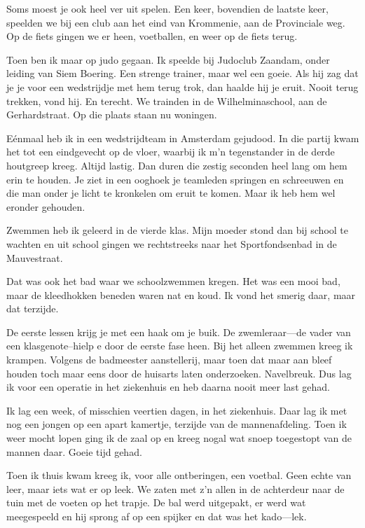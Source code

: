 \documentclass[10pt,twoside,openright]{memoir}
\begin{document}
Soms moest je ook heel ver uit spelen. Een keer, bovendien de laatste keer, speelden we bij een club aan het eind van Krommenie, aan de Provinciale weg. Op de fiets gingen we er heen, voetballen, en weer op de fiets terug. 

Toen ben ik maar op judo gegaan. Ik speelde bij Judoclub Zaandam, onder leiding van Siem Boering. Een strenge trainer, maar wel een goeie. Als hij zag dat je je voor een wedstrijdje met hem terug trok, dan haalde hij je eruit. Nooit terug trekken, vond hij. En terecht. We trainden in de Wilhelminaschool, aan de Gerhardstraat. Op die plaats staan nu woningen.

Eénmaal heb ik in een wedstrijdteam in Amsterdam gejudood. In die partij kwam het tot een eindgevecht op de vloer, waarbij ik m’n tegenstander in de derde houtgreep kreeg. Altijd lastig. Dan duren die zestig seconden heel lang om hem erin te houden. Je ziet in een ooghoek je teamleden springen en schreeuwen en die man onder je licht te kronkelen om eruit te komen. Maar ik heb hem wel eronder gehouden. 

Zwemmen heb ik geleerd in de vierde klas. Mijn moeder stond dan bij school te wachten en uit school gingen we rechtstreeks naar het Sportfondsenbad in de Mauvestraat. 

Dat was ook het bad waar we schoolzwemmen kregen. Het was een mooi bad, maar de kleedhokken beneden waren nat en koud. Ik vond het smerig daar, maar dat terzijde. 

De eerste lessen krijg je met een haak om je buik. De zwemleraar---de vader van een klasgenote--hielp e door de eerste fase heen. Bij het alleen zwemmen kreeg ik krampen. Volgens de badmeester aanstellerij, maar toen dat maar aan bleef houden toch maar eens door de huisarts laten onderzoeken. Navelbreuk. Dus lag ik voor een operatie in het ziekenhuis en heb daarna nooit meer last gehad.

Ik lag een week, of misschien veertien dagen, in het ziekenhuis. Daar lag ik met nog een jongen op een apart kamertje, terzijde van de mannenafdeling. Toen ik weer mocht lopen ging ik de zaal op en kreeg nogal wat snoep toegestopt van de mannen daar. Goeie tijd gehad.

Toen ik thuis kwam kreeg ik, voor alle ontberingen, een voetbal. Geen echte van leer, maar iets wat er op leek. We zaten met z’n allen in de achterdeur naar de tuin met de voeten op het trapje. De bal werd uitgepakt, er werd wat meegespeeld en hij sprong af op een spijker en dat was het kado---lek. 
\end{document}
